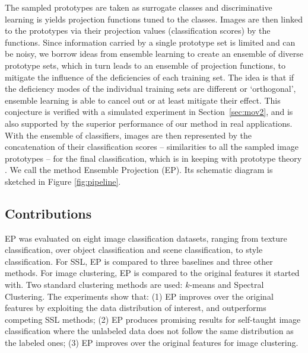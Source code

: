 \documentclass[preprint,12pt,3p]{elsarticle}
\begin{document}
The sampled prototypes are taken as surrogate classes and
discriminative learning is yields projection functions tuned to the
classes. Images are then linked to the prototypes via their projection
values (classification scores) by the functions. Since information
carried by a single prototype set is limited and can be noisy, we
borrow ideas from ensemble learning \citep{EnClasReview} to create an
ensemble of diverse prototype sets, which in turn leads to an ensemble
of projection functions, to mitigate the influence of the deficiencies
of each training set. The idea is that if the deficiency modes of the
individual training sets are different or `orthogonal', ensemble
learning is able to cancel out or at least mitigate their effect. This
conjecture is verified with a simulated experiment in
Section~\ref{sec:mov2}, and is also supported by the superior performance
of our method in real applications. With the ensemble of classifiers,
images are then represented by the concatenation of their
classification scores -- similarities to all the sampled image
prototypes -- for the final classification, which is in keeping with
prototype theory \citep{Rosch:1978}. We call the method Ensemble
Projection (EP). Its schematic diagram is sketched in
Figure \ref{fig:pipeline}.

\subsection{Contributions}
EP was evaluated on eight image classification datasets, ranging from
texture classification, over object classification and scene
classification, to style classification. For SSL, EP is compared
to three baselines and three other methods. For image clustering, EP is
compared to the original features it started with. Two standard clustering methods are used: $k$-means and
Spectral Clustering.  The experiments show that: (1) EP improves over
the original features by exploiting the data distribution of interest, 
and outperforms competing SSL methods; (2) EP
produces promising results for self-taught image classification where
the unlabeled data does not follow the same distribution as the
labeled ones; (3) EP improves over the original features for image clustering.
\end{document}
